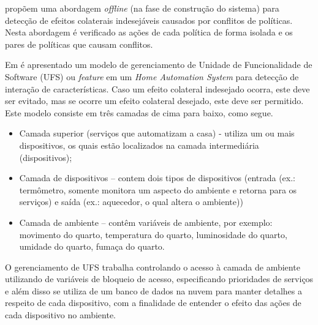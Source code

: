 \cite{Maternaghan:2013} propõem uma abordagem \textit{offline} (na fase de construção do sistema) para detecção de efeitos colaterais indesejáveis causados por conflitos de políticas. Nesta abordagem é verificado as ações de cada política de forma isolada e os pares de políticas que causam conflitos.

Em \cite{Wilson:2008} é apresentado um modelo de gerenciamento de Unidade de Funcionalidade de Software (UFS) ou \textit{feature} em um \textit{Home Automation System} para detecção de interação de características. Caso um efeito colateral indesejado ocorra, este deve ser evitado, mas se ocorre um efeito colateral desejado, este deve ser permitido. Este modelo consiste em três camadas de cima para baixo, como segue.
\begin{itemize}
   \item Camada superior (serviços que automatizam a casa) - utiliza um ou mais dispositivos, os quais estão localizados na camada intermediária (dispositivos);
   \item Camada de dispositivos – contem dois tipos de dispositivos (entrada (ex.: termômetro, somente monitora um aspecto do ambiente e retorna para os serviços) e saída (ex.: aquecedor, o qual altera o ambiente))
   \item Camada de ambiente – contêm variáveis de ambiente, por exemplo: movimento do quarto, temperatura do quarto, luminosidade do quarto, umidade do quarto, fumaça do quarto.
\end{itemize} O gerenciamento de UFS trabalha controlando o acesso à camada de ambiente utilizando de variáveis de bloqueio de acesso, especificando prioridades de serviços e além disso se utiliza de um banco de dados na nuvem para manter detalhes a respeito de cada dispositivo, com a finalidade de entender o efeito das ações de cada dispositivo no ambiente.

